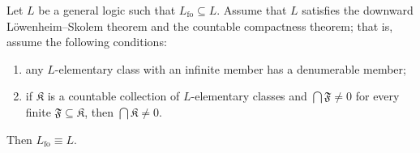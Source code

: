 Let $L$ be a general logic such that $L_{\mathrm{fo}} \subseteq L$. Assume that $L$ satisfies the downward L\"owenheim--Skolem theorem and the countable compactness theorem; that is, assume the following conditions:

\begin{enumerate}
  \item[(i)] any $L$-elementary class with an infinite member has a denumerable member;
  \item[(ii)] if $\mathfrak{K}$ is a countable collection of $L$-elementary classes and $\bigcap \mathfrak{F} \neq 0$ for every finite $\mathfrak{F} \subseteq \mathfrak{K}$, then $\bigcap \mathfrak{K} \neq 0$.
\end{enumerate}

Then $L_{\mathrm{fo}} \equiv L$.
